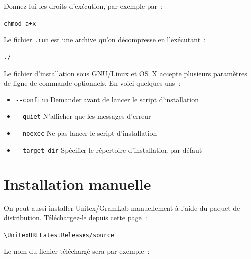 \noindent Donnez-lui les droits d'exécution, par exemple par~:

\begin{flushleft}
{\tt chmod a+x \UnitexPackageLinux{}}
\end{flushleft}

\noindent Le fichier \verb+.run+ est une archive qu'on décompresse en l'exécutant~: 

\begin{flushleft}
{\tt ./\UnitexPackageLinux{}}
\end{flushleft}

\begin{samepage}
\noindent Le fichier d'installation sous GNU/Linux et OS~X accepte plusieurs paramètres de ligne de commande optionnels. En voici quelques-uns~:

\begin{itemize}
\itemsep1pt\parskip0pt
\item
  \texttt{-\/-confirm} \hspace{.15in} Demander avant de lancer le script d'installation \\
\item
  \texttt{-\/-quiet} \hspace{.15in} N'afficher que les messages d'erreur\\
\item
  \texttt{-\/-noexec} \hspace{.15in} Ne pas lancer le script d'installation \\
\item
  \texttt{-\/-target dir}  \hspace{.15in} Spécifier le répertoire d'installation par défaut
\end{itemize}
\end{samepage}

\section{Installation manuelle}
\begin{samepage}

On peut aussi installer Unitex/GramLab manuellement à l'aide du paquet de distribution. Téléchargez-le depuis cette page~:
\nopagebreak
\begin{center}
{\tt\url{\UnitexURLLatestReleases/source}}
\end{center}

\noindent Le nom du fichier téléchargé sera par exemple~:
\begin{flushleft}
{\tt \UnitexPackageSource{}}
\end{flushleft}

\end{samepage}

